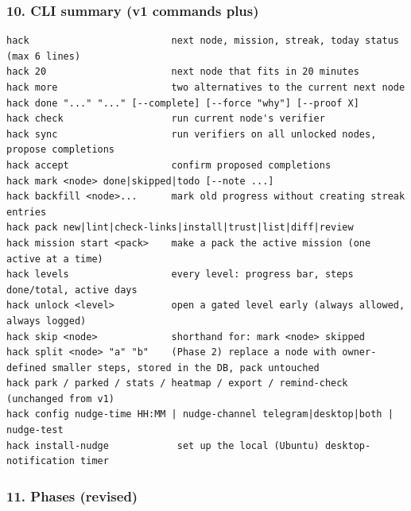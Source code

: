 \hypertarget{hackstreak-spec-v2-10-cli-summary-v1-commands-plus}{%
\subsubsection{10. CLI summary (v1 commands
plus)}\label{hackstreak-spec-v2-10-cli-summary-v1-commands-plus}}

\begin{verbatim}
hack                         next node, mission, streak, today status (max 6 lines)
hack 20                      next node that fits in 20 minutes
hack more                    two alternatives to the current next node
hack done "..." "..." [--complete] [--force "why"] [--proof X]
hack check                   run current node's verifier
hack sync                    run verifiers on all unlocked nodes, propose completions
hack accept                  confirm proposed completions
hack mark <node> done|skipped|todo [--note ...]
hack backfill <node>...      mark old progress without creating streak entries
hack pack new|lint|check-links|install|trust|list|diff|review
hack mission start <pack>    make a pack the active mission (one active at a time)
hack levels                  every level: progress bar, steps done/total, active days
hack unlock <level>          open a gated level early (always allowed, always logged)
hack skip <node>             shorthand for: mark <node> skipped
hack split <node> "a" "b"    (Phase 2) replace a node with owner-defined smaller steps, stored in the DB, pack untouched
hack park / parked / stats / heatmap / export / remind-check     (unchanged from v1)
hack config nudge-time HH:MM | nudge-channel telegram|desktop|both | nudge-test
hack install-nudge            set up the local (Ubuntu) desktop-notification timer
\end{verbatim}

\hypertarget{hackstreak-spec-v2-11-phases-revised}{%
\subsubsection{11. Phases (revised)}\label{hackstreak-spec-v2-11-phases-revised}}


